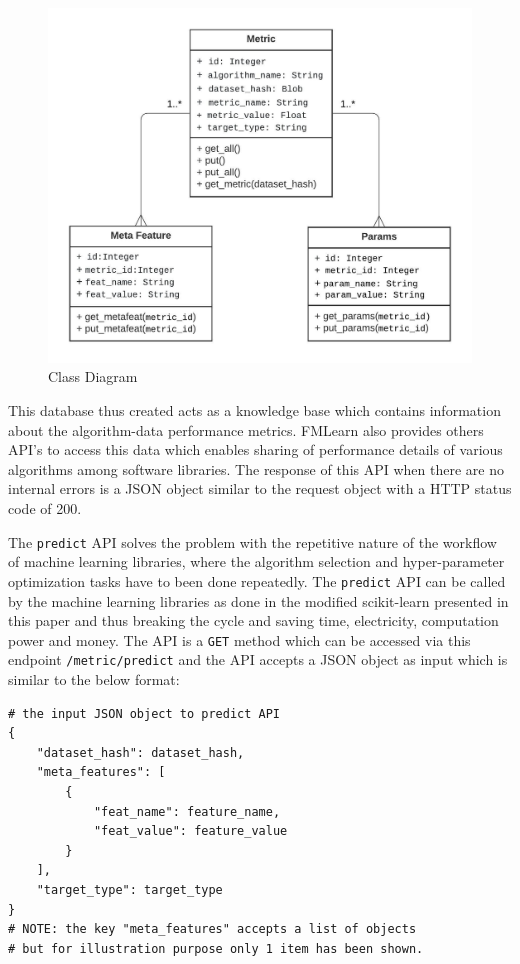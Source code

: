 \begin{figure}[t]
    \centering
    \includegraphics[width=15cm]{images/Class Diagram.jpeg}
    \caption{Class Diagram}
    \label{class-diagram}
\end{figure}

This database thus created acts as a knowledge base which contains information about the algorithm-data performance metrics. FMLearn also provides others API's to access this data which enables sharing of performance details of various algorithms among software libraries. The response of this API when there are no internal errors is a JSON object similar to the request object with a HTTP status code of 200.

The \texttt{predict} API solves the problem with the repetitive nature of the workflow of machine learning libraries, where the algorithm selection and hyper-parameter optimization tasks have to been done repeatedly. The \texttt{predict} API can be called by the machine learning libraries as done in the modified scikit-learn presented in this paper and thus breaking the cycle and saving time, electricity, computation power and money. The API is a \texttt{GET} method which can be accessed via this endpoint \texttt{/metric/predict} and the API accepts a JSON object as input which is similar to the below format:

\begin{lstlisting}
# the input JSON object to predict API
{
	"dataset_hash": dataset_hash,
	"meta_features": [
		{
			"feat_name": feature_name,
			"feat_value": feature_value
		}
	],
	"target_type": target_type
}
# NOTE: the key "meta_features" accepts a list of objects
# but for illustration purpose only 1 item has been shown.
\end{lstlisting}

